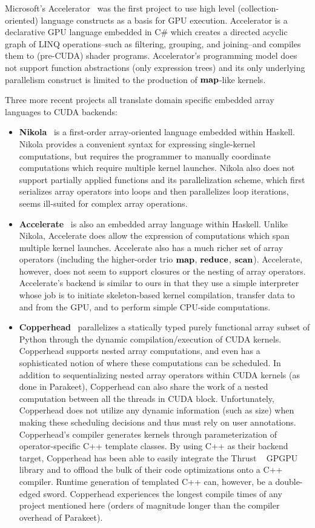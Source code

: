 \documentclass[preprint]{sigplanconf}
\begin{document}
Microsoft's Accelerator~\cite{Tard06} was the first project to use high level
(collection-oriented) language constructs as a basis for GPU execution.
Accelerator is a declarative GPU language embedded in C\# which creates a
directed acyclic graph of LINQ operations--such as filtering, grouping, and
joining--and compiles them to
(pre-CUDA) shader programs. Accelerator's programming model does not support
function abstractions (only expression trees) and its only underlying
parallelism construct is limited to the production of $\mbox{\textbf{map}}$-like kernels. 

Three more recent projects all translate domain specific embedded array
languages to CUDA backends:
\begin{itemize}
\item \textbf{Nikola}~\cite{Main10} is a first-order array-oriented language
embedded within Haskell. Nikola provides a convenient syntax for expressing
single-kernel computations, but requires the programmer to manually coordinate
computations which require multiple kernel launches. Nikola also does not
support partially applied functions and its parallelization scheme, which first
serializes array operators into loops and then parallelizes loop iterations,
seems ill-suited for complex array operations. 

\item \textbf{Accelerate}~\cite{ChakAcc} is also an embedded array language
within Haskell. Unlike Nikola, Accelerate does allow the expression of
computations which span multiple kernel launches. Accelerate also has a much
richer set of array operators (including the higher-order trio $\mbox{\textbf{map}}$,
$\mbox{\textbf{reduce}}$, $\mbox{\textbf{scan}}$). Accelerate, however, does not seem to support closures or
the nesting of array operators. Accelerate's backend is similar to ours in that
they use a simple interpreter whose job is to initiate skeleton-based kernel
compilation, transfer data to and from the GPU, and to perform simple CPU-side
computations.

\item \textbf{Copperhead}~\cite{Cata10} parallelizes a statically typed purely
functional array subset of Python through the dynamic compilation/execution of
CUDA kernels. Copperhead supports nested array computations, and even has a
sophisticated notion of where these computations can be scheduled. In addition
to sequentializing nested array operators within CUDA kernels (as done in
Parakeet), Copperhead can also share the work of a nested computation between
all the threads in CUDA block. Unfortunately, Copperhead does not utilize any
dynamic information (such as size) when making these scheduling decisions and
thus must rely on user annotations. Copperhead's compiler generates kernels
through parameterization of operator-specific C++ template classes. By using C++
as their backend target, Copperhead has been able to easily integrate the Thrust
~\cite{Hobe10} GPGPU library and to offload the bulk of their
code optimizations onto a C++ compiler. Runtime generation of templated C++ can,
however, be a double-edged sword. Copperhead experiences the longest compile
times of any project mentioned here (orders of magnitude longer than the
compiler overhead of Parakeet).
\end{itemize}
\end{document}
